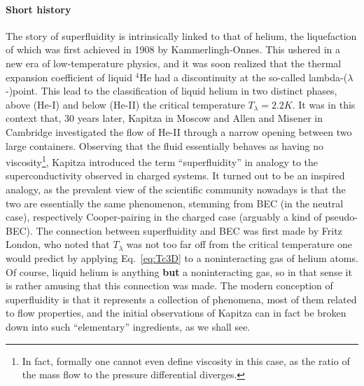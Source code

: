 \paragraph{Short history}
The story of superfluidity is intrinsically linked to that of helium,
the liquefaction of which was first achieved in 1908 by
Kammerlingh-Onnes. This ushered in a new era of low-temperature
physics, and it was soon realized that the thermal expansion
coefficient of liquid ${}^4$He had a discontinuity at the so-called
lambda-($\lambda$-)point. This lead to the classification of liquid
helium in two distinct phases, above (He-I) and below (He-II) the
critical temperature $T_{\lambda} = 2.2K$. It was in this context
that, 30 years later, Kapitza in Moscow and Allen and Misener in
Cambridge investigated the flow of He-II through a narrow opening
between two large containers. Observing that the fluid essentially
behaves as having no viscosity\footnote{In fact, formally one cannot
  even define viscosity in this case, as the ratio of the mass flow to
  the pressure differential diverges.}, Kapitza introduced the term
``superfluidity'' in analogy to the superconductivity observed in
charged systems. It turned out to be an inspired analogy, as the
prevalent view of the scientific community nowadays is that the two
are essentially the same phenomenon, stemming from BEC (in the neutral
case), respectively Cooper-pairing in the charged case (arguably a
kind of pseudo-BEC). The connection between superfluidity and BEC was
first made by Fritz London, who noted that $T_{\lambda}$ was not too
far off from the critical temperature one would predict by applying
Eq.~\eqref{eq:Tc3D} to a noninteracting gas of helium atoms. Of
course, liquid helium is anything \textbf{but} a noninteracting gas, so in that
sense it is rather amusing that this connection was made. The modern
conception of superfluidity is that it represents a collection of
phenomena, most of them related to flow properties, and the initial
observations of Kapitza can in fact be broken down into such
``elementary'' ingredients, as we shall see.

